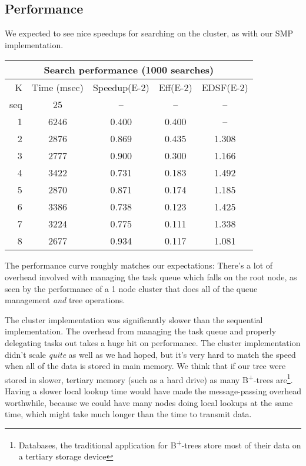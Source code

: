\documentclass[conference]{IEEEtran}
\begin{document}
\subsection{Performance}
We expected to see nice speedups for searching on the cluster, as with our SMP
implementation.
\begin{center}
\begin{tabular}{ | r | c | c | c | c | }
\hline
\multicolumn{5}{|c|}{Search performance (1000 searches)}\\\hline\hline
K & Time (msec) & Speedup({\small E}-2) & Eff({\small E}-2) & EDSF({\small E}-2) \\\hline
seq & 25 & \--- & \--- & \--- \\\hline
1&6246 & 0.400 & 0.400 & \--- \\\hline
2&2876 & 0.869 & 0.435 & 1.308 \\\hline
3&2777 & 0.900 & 0.300 & 1.166 \\\hline
4&3422 & 0.731 & 0.183 & 1.492 \\\hline
5&2870 & 0.871 & 0.174 & 1.185 \\\hline
6&3386 & 0.738 & 0.123 & 1.425 \\\hline
7&3224 & 0.775 & 0.111 & 1.338 \\\hline
8&2677 & 0.934 & 0.117 & 1.081 \\\hline
\end{tabular}
\end{center}
The performance curve roughly matches our expectations: There's a lot of overhead
involved with managing the task queue which falls on the root node, as seen by
the performance of a 1 node cluster that does all of the queue management {\em
and} tree operations.

The cluster implementation was significantly slower than the sequential
implementation. The overhead from managing the task queue and properly
delegating tasks out takes a huge hit on performance. The cluster implementation
didn't scale {\em quite} as well as we had hoped, but it's very hard to match
the speed when all of the data is stored in main memory. We think that if our
tree were stored in slower, tertiary memory (such as a hard drive) as many
B\textsuperscript{+}-trees are\footnote{Databases, the traditional application
for B\textsuperscript{+}-trees store most of their data on a tertiary storage
device}. Having a slower local lookup time would have made the message-passing
overhead worthwhile, because we could have many nodes doing local lookups at the
same time, which might take much longer than the time to transmit data.
\end{document}

